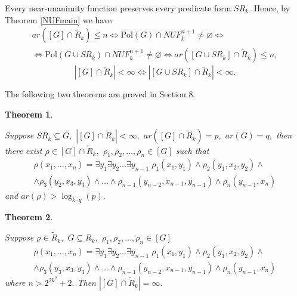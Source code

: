 \documentclass{au}
\theoremstyle{plain}
\newtheorem{theorem}{Theorem}
\theoremstyle{definition}
\theoremstyle{remark}
\numberwithin{equation}{section}
\begin{document}
Every near-unanimity function preserves every predicate form $SR_{k}.$
Hence, by Theorem \ref{NUFmain} we have
\begin{multline*}
ar([G] \cap \widetilde R_{k})\le n \Longleftrightarrow
{
\mathrm{Pol}
}(G)\cap NUF_{k}^{n+1}\neq \varnothing \Longleftrightarrow \\
\Longleftrightarrow
{
\mathrm{Pol}
}(G\cup SR_{k})\cap NUF_{k}^{n+1}\neq \varnothing \Longleftrightarrow
ar([G\cup SR_{k}] \cap \widetilde R_{k})\le n,
\end{multline*}
$$|[G] \cap \widetilde R_{k}|<\infty \Longleftrightarrow
|[G\cup SR_{k}] \cap \widetilde R_{k}|<\infty.$$

\setcounter{dveteoremy}{\value{theorem}}

The following two theorems are proved in Section 8.

\begin{theorem}\label{posledovatelnostPredikatov}

Suppose $SR_{k}\subseteq G,$
$|[G]\cap \widetilde R_{k}|<\infty,$
$ar([G]\cap \widetilde R_{k})=p,$
$ar(G)=q,$
then there exist $\rho \in [G]\cap \widetilde R_{k},$
$\rho_{1},\rho_{2},\ldots,\rho_{n}\in [G]$
such that
\begin{multline*}\rho(x_{1},\ldots,x_{n}) = \exists y_{1}\exists y_{2}\ldots\exists y_{n-1}\;
\rho_{1}(x_{1},y_{1})\wedge
\rho_{2}(y_{1},x_{2},y_{2})\wedge \\ \wedge
\rho_{3}(y_{2},x_{3},y_{3})\wedge \ldots \wedge
\rho_{n-1}(y_{n-2},x_{n-1},y_{n-1})\wedge
\rho_{n}(y_{n-1},x_{n})
\end{multline*}
and
$ar(\rho)>\log_{k\cdot q}(p).$

\end{theorem}

\begin{theorem}\label{beskonechnayaPosledovatelnost}

Suppose $\rho \in \widetilde R_{k},$ $G\subseteq R_{k},$ $\rho_{1},\rho_{2},\ldots,\rho_{n}\in [G]$
\begin{multline*}\rho(x_{1},\ldots,x_{n}) = \exists y_{1}\exists y_{2}\ldots\exists y_{n-1}\;
\rho_{1}(x_{1},y_{1})\wedge
\rho_{2}(y_{1},x_{2},y_{2})\wedge \\ \wedge
\rho_{3}(y_{3},x_{3},y_{3})\wedge \ldots \wedge
\rho_{n-1}(y_{n-2},x_{n-1},y_{n-1})\wedge
\rho_{n}(y_{n-1},x_{n})
\end{multline*}
where $n>2^{2k^{2}}+2.$
Then $|[G] \cap \widetilde R_{k}| = \infty.$

\end{theorem}
\end{document}
